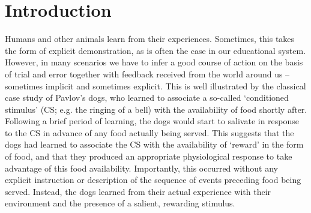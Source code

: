\section{Introduction}
\label{sec:intro}

Humans and other animals learn from their experiences.
Sometimes, this takes the form of explicit demonstration, as is often the case in our educational system.
However, in many scenarios we have to infer a good course of action on the basis of trial and error together with feedback received from the world around us -- sometimes implicit and sometimes explicit.
This is well illustrated by the classical case study of Pavlov's dogs, who learned to associate a so-called `conditioned stimulus' (CS; e.g. the ringing of a bell) with the availability of food shortly after.
Following a brief period of learning, the dogs would start to salivate in response to the CS in advance of any food actually being served.
This suggests that the dogs had learned to associate the CS with the availability of `reward' in the form of food, and that they produced an appropriate physiological response to take advantage of this food availability.
Importantly, this occurred without any explicit instruction or description of the sequence of events preceding food being served.
Instead, the dogs learned from their actual experience with their environment and the presence of a salient, rewarding stimulus.


